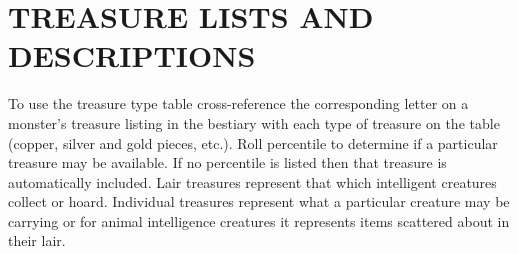 \chapter{TREASURE LISTS AND DESCRIPTIONS}

\begin{multicols}{2}

To use the treasure type table cross-reference the corresponding letter on a monster's treasure listing in the bestiary with each type of treasure on the table (copper, silver and gold pieces, etc.).  Roll percentile to determine if a particular treasure may be available.  If no percentile is listed then that treasure is automatically included.  Lair treasures represent that which intelligent creatures collect or hoard.  Individual treasures represent what a particular creature may be carrying or for animal intelligence creatures it represents items scattered about in their lair.  

\end{multicols}

